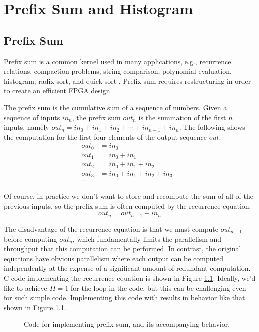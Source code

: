 
\chapter{Prefix Sum and Histogram}
\glsresetall
\label{chapter:prefixsum}

\section{Prefix Sum}
\label{sec:prefixSum}

Prefix sum is a common kernel used in many applications, e.g., recurrence relations, 
compaction problems, string comparison, polynomial evaluation, histogram, radix sort, and quick sort \cite{blelloch1990prefix}. Prefix sum requires restructuring in order to create an efficient FPGA design.

The prefix sum is the cumulative sum of a sequence of numbers. Given a sequence of inputs $in_n$, the prefix sum $out_n$ is the summation of the first $n$ inputs, namely $out_n = in_0 + in_1 + in_2 + \cdots + in_{n-1} + in_n$. The following shows the computation for the first four elements of the output sequence $out$.
\begin{align*} 
out_0 & = in_0 &\\
out_1 & = in_0 + in_1 &\\
out_2 & = in_0 + in_1 + in_2 \\
out_3 & = in_0 + in_1 + in_2 + in_3 \\
\cdots
\end{align*}

Of course, in practice we don't want to store and recompute the sum of all of the previous inputs, so the prefix sum is often computed by the recurrence equation:
\begin{equation}
out_n = out_{n-1} + in_n
\end{equation}

The disadvantage of the recurrence equation is that we must compute $out_{n-1}$ before computing $out_n$, which fundamentally limits the parallelism and throughput that this computation can be performed.  In contrast, the original equations have obvious parallelism where each output can be computed independently at the expense of a significant amount of redundant computation.  C code implementing the recurrence equation is shown in Figure \ref{fig:prefixsumSW}. Ideally, we'd like to achieve $II=1$ for the loop in the code, but this can be challenging even for such simple code.  Implementing this code with \VHLS results in behavior like that shown in Figure \ref{fig:prefixsumSW}.
\begin{figure}
\begin{minipage}{.5\textwidth}

\end{minipage}
\begin{minipage}{.5\textwidth}
\centering

\end{minipage}
\caption{ Code for implementing prefix sum, and its accompanying behavior. }
\label{fig:prefixsumSW}
\end{figure}

